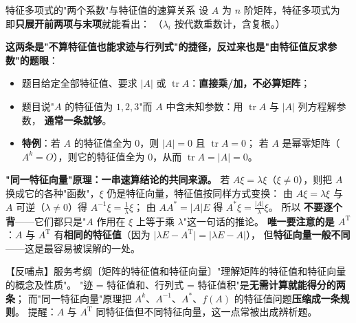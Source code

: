 \begin{fdeep}{特征多项式的"两个系数"与特征值的速算关系}
设 $A$ 为 $n$ 阶矩阵，特征多项式为
即\textbf{只展开前两项与末项}就能看出：
（$\lambda_i$ 按代数重数计，含复根。）

\textbf{这两条是"不算特征值也能求迹与行列式"的捷径，反过来也是"由特征值反求参数"的题眼}：
\begin{itemize}[leftmargin=2.2em,itemsep=0.22em]
\item 题目给定全部特征值、要求 $\lvert A\rvert$ 或 $\operatorname{tr}A$：\textbf{直接乘/加，不必算矩阵}；
\item 题目说"$A$ 的特征值为 $1,2,3$"而 $A$ 中含未知参数：用 $\operatorname{tr}A$ 与 $\lvert A\rvert$ 列方程解参数，
      \textbf{通常一条就够}。
\item \textbf{特例}：若 $A$ 的特征值全为 $0$，则 $\lvert A\rvert=0$ 且 $\operatorname{tr}A=0$；
      若 $A$ 是幂零矩阵（$A^{k}=O$），则它的特征值全为 $0$，从而 $\operatorname{tr}A=\lvert A\rvert=0$。
\end{itemize}

\medskip
\textbf{"同一特征向量"原理：一串速算结论的共同来源。}
若 $A\xi=\lambda\xi$（$\xi\ne0$），则把 $A$ 换成它的各种"函数"，$\xi$ 仍是特征向量，特征值按同样方式变换：
由 $A\xi=\lambda\xi$ 与 $A$ 可逆（$\lambda\ne0$）得 $A^{-1}\xi=\tfrac1\lambda\xi$；
由 $AA^{*}=\lvert A\rvert E$ 得 $A^{*}\xi=\tfrac{\lvert A\rvert}{\lambda}\xi$。
所以
\textbf{不要逐个背}——它们都只是"$A$ 作用在 $\xi$ 上等于乘 $\lambda$"这一句话的推论。
\textbf{唯一要注意的是 $A^{\mathrm T}$}：$A$ 与 $A^{\mathrm T}$ 有\textbf{相同的特征值}（因为 $\lvert\lambda E-A^{\mathrm T}\rvert=\lvert\lambda E-A\rvert$），
但\textbf{特征向量一般不同}——这是最容易被误解的一处。

【反哺点】服务考纲〔矩阵的特征值和特征向量〕"理解矩阵的特征值和特征向量的概念及性质"。
"迹 = 特征值和、行列式 = 特征值积"是\textbf{无需计算就能得分的两条}；
而"同一特征向量"原理把 $A^{k}$、$A^{-1}$、$A^{*}$、$f(A)$ 的特征值问题\textbf{压缩成一条规则}。
提醒：$A$ 与 $A^{\mathrm T}$ 同特征值但不同特征向量，这一点常被出成辨析题。
\end{fdeep}

